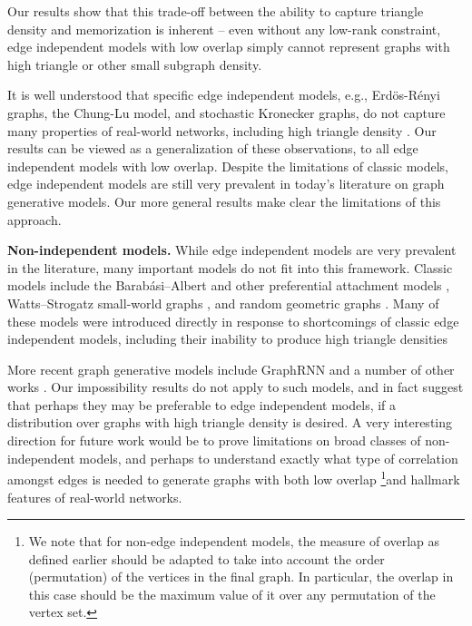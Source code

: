 \documentclass{article}
\begin{document}
Our results show that this trade-off between the ability to capture triangle density and memorization is inherent -- even without any low-rank constraint, edge independent models with low overlap simply cannot represent graphs with high triangle or other small subgraph density.

It is well understood that specific edge independent models, e.g., Erd\"{o}s-R\'{e}nyi graphs, the Chung-Lu model, and stochastic Kronecker graphs, do not capture many properties of real-world networks, including high triangle density \cite{WattsStrogatz:1998,PinarSeshadhriKolda:2012}. Our results can be viewed as a generalization of these observations, to all edge independent models with low overlap. Despite the limitations of classic models, edge independent models are still very prevalent in today's literature on graph generative models. Our more general results make clear the limitations of this approach.

\noindent\textbf{Non-independent models.} While edge independent models are very prevalent in the literature, many important models do not fit into this framework. Classic models include the Barab\'{a}si–Albert and other preferential attachment models \cite{BarabasiAlbert:1999}, Watts–Strogatz  small-world graphs \cite{WattsStrogatz:1998}, and random geometric graphs \cite{DallChristensen:2002}. Many of these models were introduced directly in response to shortcomings of classic edge independent models, including their  inability to produce high triangle densities

More recent graph generative models include 
GraphRNN \cite{YouYingRen:2018} and a number of other works \cite{LiVinyalsDyer:2018,LiaoLiSong:2019}.
Our impossibility results do not apply to such models, and in fact suggest that perhaps they may be preferable to edge independent models, if a distribution over graphs with high triangle density is desired. A very interesting direction for future work would be to prove limitations on broad classes of non-independent models, and perhaps to understand exactly what type of correlation amongst edges is needed to generate graphs with both low overlap \footnote{We note that for non-edge independent models, the measure of overlap as defined earlier should be adapted to take into account the order (permutation) of the vertices in the final graph. In particular, the overlap in this case should be the maximum value of it over any permutation of the vertex set.}and hallmark features of real-world networks.
\end{document}

